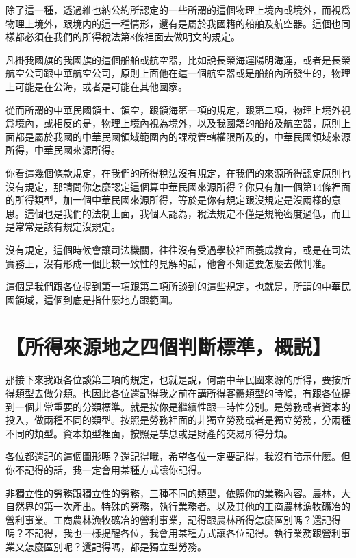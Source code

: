 \documentclass[]{ctexbook}
\begin{document}
除了這一種，透過維也納公約所認定的一些所謂的這個物理上境內或境外，而視爲物理上境外，跟境内的這一種情形，還有是屬於我國籍的船舶及航空器。這個也同樣都必須在我們的所得稅法第8條裡面去做明文的規定。

凡掛我國旗的我國旗的這個船舶或航空器，比如說長榮海運陽明海運，或者是長榮航空公司跟中華航空公司，原則上面他在這一個航空器或是船舶內所發生的，物理上可能是在公海，或者是可能在其他國家。

從而所謂的中華民國領土、領空，跟領海第一項的規定，跟第二項，物理上境外視爲境內，或相反的是，物理上境內視為境外，以及我國籍的船舶及航空器，原則上面都是屬於我國的中華民國領域範圍內的課稅管轄權限所及的，中華民國領域來源所得，中華民國來源所得。

你看這幾個條款規定，在我們的所得稅法沒有規定，在我們的來源所得認定原則也沒有規定，那請問你怎麼認定這個算中華民國來源所得？你只有加一個第14條裡面的所得類型，加一個中華民國來源所得，等於是你有規定跟沒規定是沒兩樣的意思。這個也是我們的法制上面，我個人認為，稅法規定不僅是規範密度過低，而且是常常是該有規定沒規定。

沒有規定，這個時候會讓司法機關，往往沒有受過學校裡面養成教育，或是在司法實務上，沒有形成一個比較一致性的見解的話，他會不知道要怎麼去做判准。

這個是我們跟各位提到第一項跟第二項所談到的這些規定，也就是，所謂的中華民國領域，這個到底是指什麼地方跟範圍。

\hypertarget{ux6240ux5f97ux4f86ux6e90ux5730ux4e4bux56dbux500bux5224ux65b7ux6a19ux6e96ux6982ux8aac}{%
\section{【所得來源地之四個判斷標準，概説】}\label{ux6240ux5f97ux4f86ux6e90ux5730ux4e4bux56dbux500bux5224ux65b7ux6a19ux6e96ux6982ux8aac}}

那接下來我跟各位談第三項的規定，也就是說，何謂中華民國來源的所得，要按所得類型去做分類。也因此各位還記得我之前在講所得客體類型的時候，有跟各位提到一個非常重要的分類標準。就是按你是繼續性跟一時性分別。是勞務或者資本的投入，做兩種不同的類型。按照是勞務裡面的非獨立勞務或者是獨立勞務，分兩種不同的類型。資本類型裡面，按照是孳息或是財產的交易所得分類。

各位都還記的這個圖形嗎？還記得哦，希望各位一定要記得，我沒有暗示什麽。但你不記得的話，我一定會用某種方式讓你記得。

非獨立性的勞務跟獨立性的勞務，三種不同的類型，依照你的業務內容。農林，大自然界的第一次產出。特殊的勞務，執行業務者。以及其他的工商農林漁牧礦冶的營利事業。工商農林漁牧礦冶的營利事業，記得跟農林所得怎麼區別嗎？還記得嗎？不記得，我也一樣提醒各位，我會用某種方式讓各位記得。執行業務跟營利事業又怎麼區別呢？還記得嗎，都是獨立型勞務。
\end{document}
